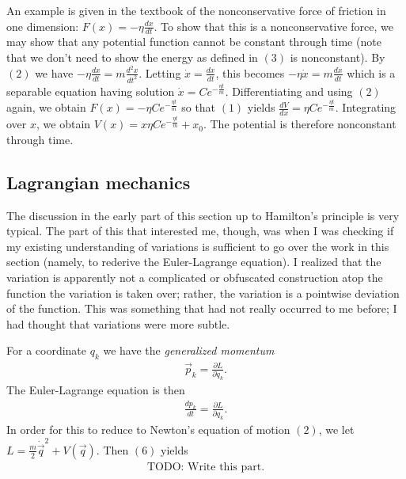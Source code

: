 \documentclass[a4paper]{article}
\begin{document}
An example is given in the textbook of the nonconservative force of friction in one dimension: $F(x) = -\eta \frac{dx}{dt}$. To show that this is a nonconservative force, we may show that any potential function cannot be constant through time (note that we don't need to show the energy as defined in $(3)$ is nonconstant). By $(2)$ we have $-\eta \frac{dx}{dt} = m\frac{d^2x}{dt^2}$. Letting $\dot{x} = \frac{dx}{dt}$, this becomes $-\eta \dot{x} = m\frac{d\dot{x}}{dt}$ which is a separable equation having solution $\dot{x} = Ce^{-\frac{\eta t}{m}}$. Differentiating and using $(2)$ again, we obtain $F(x) = -\eta Ce^{-\frac{\eta t}{m}}$ so that $(1)$ yields $\frac{dV}{dx} = \eta Ce^{-\frac{\eta t}{m}}$. Integrating over $x$, we obtain $V(x) = x\eta Ce^{-\frac{\eta t}{m}} + x_0$. The potential is therefore nonconstant through time.

\subsection{Lagrangian mechanics}

The discussion in the early part of this section up to Hamilton's principle is very typical. The part of this that interested me, though, was when I was checking if my existing understanding of variations is sufficient to go over the work in this section (namely, to rederive the Euler-Lagrange equation). I realized that the variation is apparently not a complicated or obfuscated construction atop the function the variation is taken over; rather, the variation is a pointwise deviation of the function. This was something that had not really occurred to me before; I had thought that variations were more subtle.

For a coordinate $q_k$ we have the \emph{generalized momentum}
\begin{align}
    \vec{p}_k = \frac{\partial L}{\partial \dot{q}_k}.
\end{align}
The Euler-Lagrange equation is then
\begin{align}
    \frac{dp_k}{dt} = \frac{\partial L}{\partial q_k}.
\end{align}
In order for this to reduce to Newton's equation of motion $(2)$, we let $L = \frac{m}{2}\dot{\vec{q}}^2 + V(\vec{q})$. Then $(6)$ yields
\begin{align}
    \text{TODO: Write this part.}
\end{align}
\end{document}
